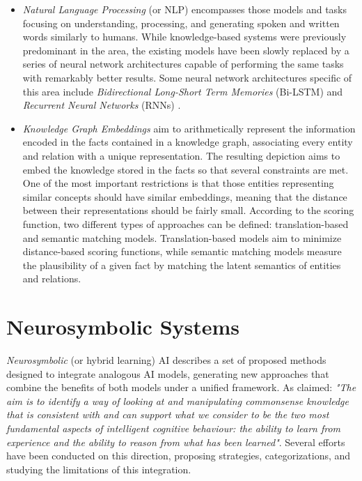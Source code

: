 \begin{itemize}
\begin{itemize}
        \item \textit{Natural Language Processing} (or NLP) \citep{chowdhury_2003_nlp} encompasses those models and tasks focusing on understanding, processing, and generating spoken and written words similarly to humans. While knowledge-based systems were previously predominant in the area, the existing models have been slowly replaced by a series of neural network architectures capable of performing the same tasks with remarkably better results. Some neural network architectures specific of this area include \textit{Bidirectional Long-Short Term Memories} (Bi-LSTM)\citep{devlin-etal-2019-bert,peters-etal-2018-deep} and \textit{Recurrent Neural Networks} (RNNs) \citep{wang-etal-2016-combination}. 
        
        \item \textit{Knowledge Graph Embeddings} \citep{dai_survey_2020} aim to arithmetically represent the information encoded in the facts contained in a knowledge graph, associating every entity and relation with a unique representation. The resulting depiction aims to embed the knowledge stored in the facts so that several constraints are met. One of the most important restrictions is that those entities representing similar concepts should have similar embeddings, meaning that the distance between their representations should be fairly small. According to the scoring function, two different types of approaches can be defined: translation-based and semantic matching models. Translation-based models aim to minimize distance-based scoring functions, while semantic matching models measure the plausibility of a given fact by matching the latent semantics of entities and relations.
    \end{itemize}

\end{itemize}


\section{Neurosymbolic Systems}
\textit{Neurosymbolic} (or hybrid learning) AI describes a set of proposed methods designed to integrate analogous AI models, generating new approaches that combine the benefits of both models under a unified framework. As \cite{valiant_three_2003} claimed: \textit{"The aim is to identify a way of looking at and manipulating commonsense knowledge that is consistent with and can support what we consider to be the two most fundamental aspects of intelligent cognitive behaviour: the ability to learn from experience and the ability to reason from what has been learned"}. Several efforts have been conducted on this direction, proposing strategies, categorizations, and studying the limitations of this integration. 

